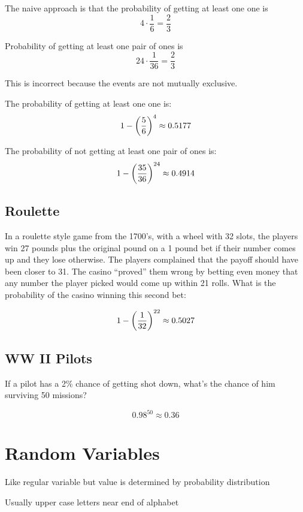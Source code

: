 \documentclass[letterpaper, landscape]{exam}
\begin{document}
  The naive approach is that the probability of getting at least one one is
  \[
    4 \cdot \frac{1}{6} = \frac{2}{3}
  \]

  Probability of getting at least one pair of ones is
  \[
    24 \cdot \frac{1}{36} = \frac{2}{3}
  \]

  This is incorrect because the events are not mutually exclusive.

  \begin{solution}
    The probability of getting at least one one is:
    \[
      1 - \del{ \frac{5}{6} }^4 \approx 0.5177
    \]

    The probability of not getting at least one pair of ones is:
    \[
      1 - \del{ \frac{35}{36} }^{24} \approx 0.4914
    \]
  \end{solution}

  \subsection{Roulette}
  In a roulette style game from the 1700's, with a wheel with 32 slots, the
  players win 27 pounds plus the original pound on a 1 pound bet if their number
  comes up and they lose otherwise. The players complained that the payoff
  should have been closer to 31. The casino ``proved'' them wrong by betting
  even money that any number the player picked would come up within 21 rolls.
  What is the probability of the casino winning this second bet:

  \begin{solution}
    \[
      1 - \del{ \frac{1}{32} }^{22} \approx 0.5027
    \]
  \end{solution}

  \subsection{WW II Pilots}
  If a pilot has a 2\% chance of getting shot down, what's the chance of him
  surviving 50 missions?

  \begin{solution}
    \[
      0.98^{50} \approx 0.36
    \]
  \end{solution}

  \section{Random Variables}
  \begin{itemize*}
    \item Like regular variable but value is determined by probability distribution
    \item Usually upper case letters near end of alphabet
  \end{itemize*}
\end{document}
